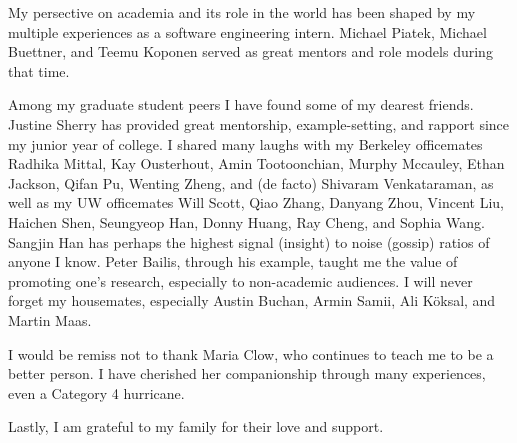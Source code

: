 \begin{acknowledgements}
My persective on academia and its role in the world has been shaped by my
multiple experiences as a software engineering intern. Michael Piatek,
Michael Buettner, and Teemu Koponen served as great mentors and role models during that time.

Among my graduate student peers I have found some of my dearest friends.
Justine Sherry has provided great mentorship, example-setting, and rapport
since my junior year of college. I shared many laughs with my Berkeley officemates
Radhika Mittal, Kay Ousterhout, Amin Tootoonchian, Murphy Mccauley, Ethan
Jackson, Qifan Pu, Wenting Zheng, and (de
facto) Shivaram Venkataraman, as well as my UW officemates Will Scott, Qiao
Zhang, Danyang Zhou, Vincent Liu, Haichen Shen, Seungyeop Han, Donny Huang, Ray Cheng, and Sophia Wang.
Sangjin Han has perhaps the highest signal (insight) to noise (gossip)
ratios of anyone I know. Peter Bailis, through his example, taught me the
value of promoting one's research, especially to non-academic audiences.
I will never forget my housemates, especially Austin Buchan, Armin
Samii, Ali K\"oksal, and Martin Maas.

I would be remiss not to thank Maria Clow, who continues to teach
me to be a better person. I have cherished her companionship through
many experiences, even a Category 4 hurricane.

Lastly, I am grateful to my family for their love and support.

%
%



\end{acknowledgements}
